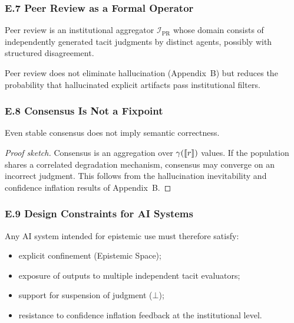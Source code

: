 \subsubsection*{E.7 Peer Review as a Formal Operator}

\begin{definition}
Peer review is an institutional aggregator $\mathcal{I}_{\mathrm{PR}}$ whose
domain consists of independently generated tacit judgments by distinct
agents, possibly with structured disagreement.
\end{definition}

Peer review does not eliminate hallucination (Appendix~B) but reduces the
probability that hallucinated explicit artifacts pass institutional filters.

\subsubsection*{E.8 Consensus Is Not a Fixpoint}

\begin{theorem}
Even stable consensus does not imply semantic correctness.
\end{theorem}

\begin{proof}[Proof sketch]
Consensus is an aggregation over $\gamma(\llbracket r \rrbracket)$ values. If the population
shares a correlated degradation mechanism, consensus may converge on an
incorrect judgment. This follows from the hallucination inevitability and
confidence inflation results of Appendix~B.
\end{proof}

\subsubsection*{E.9 Design Constraints for AI Systems}

Any AI system intended for epistemic use must therefore satisfy:

\begin{itemize}
\item explicit confinement (Epistemic Space);
\item exposure of outputs to multiple independent tacit evaluators;
\item support for suspension of judgment ($\bot$);
\item resistance to confidence inflation feedback at the institutional level.
\end{itemize}

